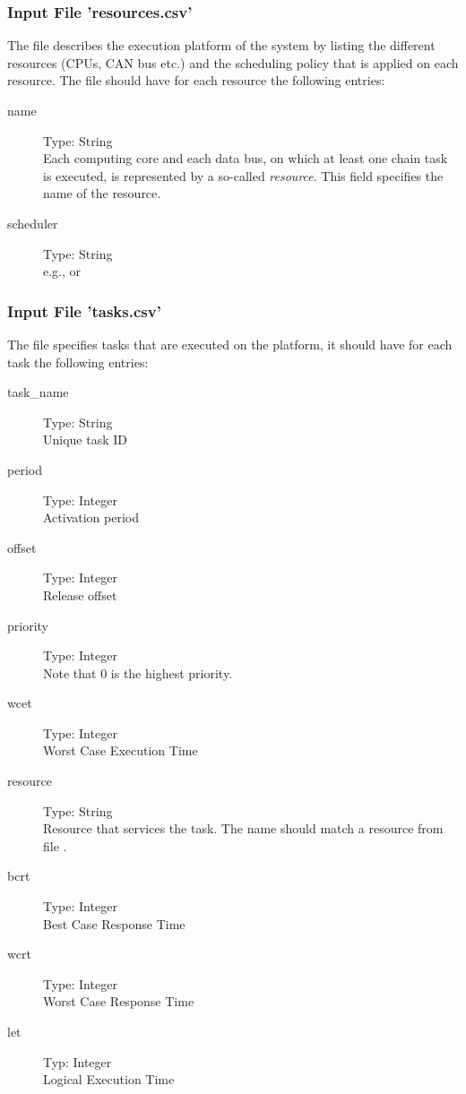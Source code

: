 \subsubsection{Input File 'resources.csv'}
\label{sec:input-files-resources}
The  file describes the execution platform of the system by listing the different resources (CPUs, CAN bus etc.) and the scheduling policy that is applied on each resource. 
The  file should have for each resource the following entries:
\begin{description}
		\item [name] Type: String \hfill \\ 
		Each computing core and each data bus, on which at least one chain task is executed, is represented by a so-called \emph{resource}.   This field specifies the name of the resource.		
		\item [scheduler] Type: String \hfill \\ 
		e.g.,  or 
\end{description}
\bigskip


\subsubsection{Input File 'tasks.csv'}
\label{sec:input-files-tasks}
The  file specifies tasks that are executed on the platform, it should have for each task the following entries:
\begin{description}
		\item [task\_name] Type: String \hfill \\ 
		Unique task ID
		\item [period] Type: Integer \hfill \\ 
		Activation period		
		\item [offset] Type: Integer \hfill \\ 
		Release offset
		\item [priority] Type: Integer \hfill \\ 
		Note that 0 is the highest priority.
		\item [wcet] Type: Integer \hfill \\ 
		Worst Case Execution Time		
		\item [resource] Type: String \hfill \\ 
		Resource that services the task. 
		The name should match a resource from file .
		\item [bcrt] Type: Integer \hfill \\ 
		Best Case Response Time		
		\item [wcrt] Type: Integer \hfill \\ 
		Worst Case Response Time
		\item [let] Typ: Integer \hfill \\ 
		Logical Execution Time 
\end{description}
\bigskip


